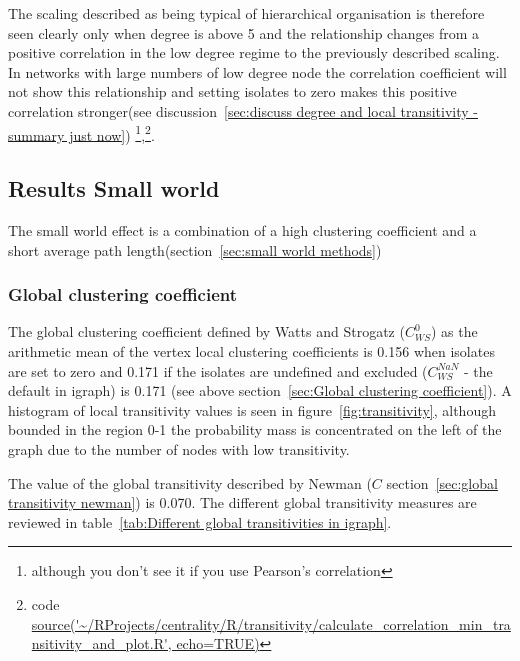 The scaling described as being typical of hierarchical organisation is therefore seen clearly only when degree is above 5 and the relationship changes from a positive correlation in the low degree regime to the previously described scaling. In networks with large numbers of low degree node the correlation coefficient will not show this relationship and setting isolates to zero makes this positive correlation stronger(see discussion~\ref{sec:discuss degree and local transitivity - summary just now}) \footnote{although you don't see it if you use Pearson's correlation},\footnote{code \url{source('~/RProjects/centrality/R/transitivity/calculate_correlation_min_transitivity_and_plot.R', echo=TRUE)}}.



\subsection{Results Small world}

The small world effect is a combination of a high clustering coefficient and a short average path length(section~\ref{sec:small world methods})
\subsubsection{Global clustering coefficient}
\label{sec:results_global_clustering_coefficient}

The global clustering coefficient defined by Watts and Strogatz ($C_{WS}^0$) as the arithmetic mean of the vertex local clustering coefficients is 0.156 when isolates are set to zero\cite{watts1998collective} and 0.171 if the isolates are undefined and excluded ($C_{WS}^{NaN}$ - the default in igraph) is 0.171 (see above section~\ref{sec:Global clustering coefficient}). A histogram of local transitivity values is seen in figure~\ref{fig:transitivity}, although bounded in the region 0-1 the probability mass is concentrated on the left of the graph due to the number of nodes with low transitivity.

 The value of the global transitivity described by Newman ($C$ section~\ref{sec:global transitivity newman}) is 0.070. The different global transitivity measures are reviewed in table~\ref{tab:Different global transitivities in igraph}.


